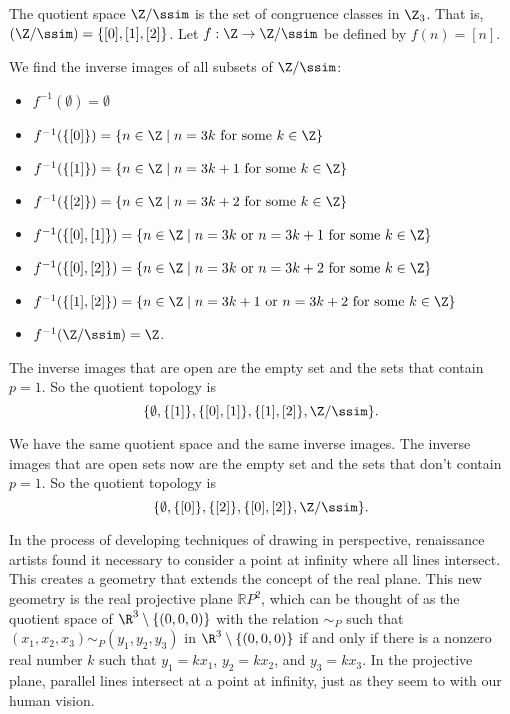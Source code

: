 \ExerciseSolution The quotient space $\Z/\ssim$ is the set of congruence classes in $\Z_3$. That is, $(\Z/\ssim) = \{[0], [1], [2]\}$. Let $f: \Z \to \Z/\ssim$ be defined by $f(n) = [n]$.
	\ba
	\item We find the inverse images of all subsets of $\Z/\ssim$:
		\begin{itemize}
		\item $f^{-1}(\emptyset) = \emptyset$
		\item $f^{-1}(\{[0]\}) = \{n \in \Z \mid n = 3k \text{ for some } k \in \Z\}$
		\item $f^{-1}(\{[1]\}) = \{n \in \Z \mid n = 3k+1 \text{ for some } k \in \Z\}$
		\item $f^{-1}(\{[2]\}) = \{n \in \Z \mid n = 3k+2 \text{ for some } k \in \Z\}$
		\item $f^{-1}(\{[0],[1]\}) = \{n \in \Z \mid n = 3k \text{ or } n = 3k+1 \text{ for some } k \in \Z\}$
		\item $f^{-1}(\{[0],[2]\}) = \{n \in \Z \mid n = 3k \text{ or } n = 3k+2 \text{ for some } k \in \Z\}$
		\item $f^{-1}(\{[1],[2]\}) = \{n \in \Z \mid n = 3k+1 \text{ or } n = 3k+2 \text{ for some } k \in \Z\}$
		\item $f^{-1}(\Z/\ssim) = \Z$.
		\end{itemize}
The inverse images that are open are the empty set and the sets that contain $p=1$. So the quotient topology is 
\[\{\emptyset, \{[1]\}, \{[0], [1]\}, \{[1], [2]\}, \Z/\ssim\}.\]

	\item We have the same quotient space and the same inverse images. The inverse images that are open sets now are the empty set and the sets that don't contain $p=1$. So the quotient topology is
\[\{\emptyset, \{[0]\}, \{[2]\}, \{[0], [2]\},  \Z/\ssim\}.\]
	
	\ea




\item In the process of developing techniques of drawing in perspective, renaissance artists found it necessary to consider a point at infinity where all lines intersect. This creates a geometry that extends the concept of the real plane. This new geometry is the real projective plane $\mathbb{R}P^2$, which can be thought of as the quotient space of $\R^3 \setminus \{(0,0,0)\}$ with the relation $\sim_P$ such that $(x_1,x_2,x_3) \sim_P (y_1,y_2,y_3)$ in $\R^3 \setminus \{(0,0,0)\}$ if and only if there is a nonzero real number $k$ such that $y_1 = kx_1$, $y_2 = kx_2$, and $y_3 = kx_3$.  In the projective plane, parallel lines intersect at a point at infinity, just as they seem to with our human vision. 

